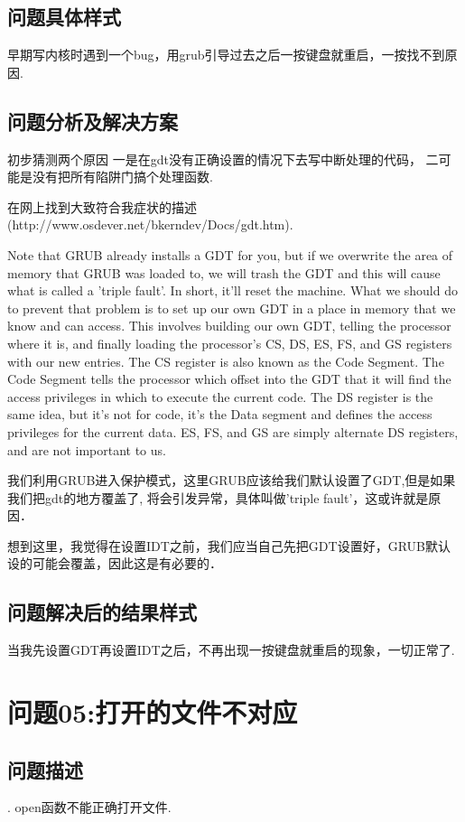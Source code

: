 \subsection{问题具体样式}
早期写内核时遇到一个bug，用grub引导过去之后一按键盘就重启，一按找不到原因. 

\subsection{问题分析及解决方案}
初步猜测两个原因 一是在gdt没有正确设置的情况下去写中断处理的代码，
二可能是没有把所有陷阱门搞个处理函数.

在网上找到大致符合我症状的描述(http://www.osdever.net/bkerndev/Docs/gdt.htm).

Note that GRUB already installs a GDT for you, 
but if we overwrite the area of memory that GRUB was loaded to, 
we will trash the GDT and this will cause what is called a 'triple fault'.
 In short, it'll reset the machine. What we should do to prevent that 
 problem is to set up our own GDT in a place in memory that we know 
 and can access. This involves building our own GDT, telling the
  processor where it is, and finally loading the processor's CS, DS, 
  ES, FS, and GS registers with our new entries. The CS register
   is also known as the Code Segment. The Code Segment tells the 
   processor which offset into the GDT that it will find the
    access privileges in which to execute the current code. 
    The DS register is the same idea, but it's not for code, 
    it's the Data segment and defines the access privileges for
     the current data. ES, FS, and GS are simply alternate DS 
     registers, and are not important to us.

我们利用GRUB进入保护模式，这里GRUB应该给我们默认设置了GDT,但是如果我们把gdt的地方覆盖了,
将会引发异常，具体叫做'triple fault'，这或许就是原因．

想到这里，我觉得在设置IDT之前，我们应当自己先把GDT设置好，GRUB默认设的可能会覆盖，因此这是有必要的．
\subsection{问题解决后的结果样式}
当我先设置GDT再设置IDT之后，不再出现一按键盘就重启的现象，一切正常了.



\section{问题05:打开的文件不对应}
\subsection{问题描述}.
open函数不能正确打开文件.
